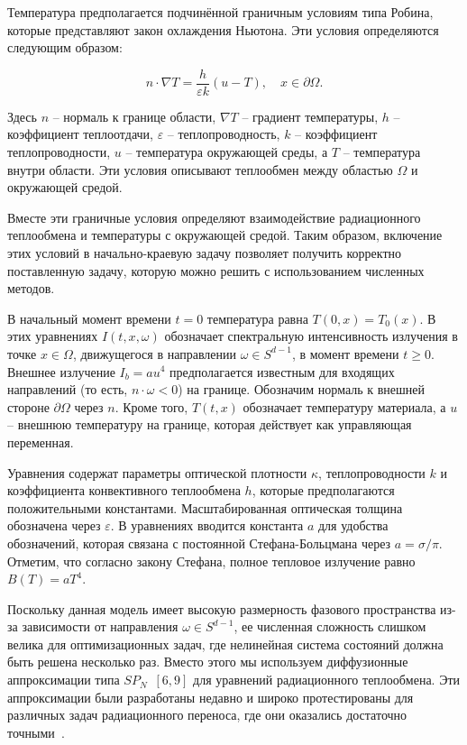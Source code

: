 Температура предполагается подчинённой граничным условиям типа Робина,
которые представляют закон охлаждения Ньютона.
Эти условия определяются следующим образом:

\[
    n \cdot \nabla T = \frac{h}{\varepsilon k}(u - T),
    \quad x \in \partial \Omega.
\]

Здесь $n$ -- нормаль к границе области, $\nabla T$ -- градиент температуры,
$h$ -- коэффициент теплоотдачи, $\varepsilon$ -- теплопроводность,
$k$ -- коэффициент теплопроводности, $u$ -- температура окружающей среды,
а $T$ -- температура внутри области.
Эти условия описывают теплообмен между областью $\Omega$ и окружающей средой.

Вместе эти граничные условия определяют взаимодействие радиационного
теплообмена и температуры с окружающей средой.
Таким образом, включение этих условий в начально-краевую задачу
позволяет получить корректно поставленную задачу, которую можно
решить с использованием численных методов.

В начальный момент времени $t = 0$ температура равна $T(0, x) = T_{0}(x)$.
В этих уравнениях $I(t, x, \omega)$ обозначает спектральную интенсивность
излучения в точке $x \in \Omega$, движущегося в направлении $\omega \in S^{d-1}$,
в момент времени $t \geq 0$.
Внешнее излучение $I_{b} = a u^{4}$ предполагается известным для входящих
направлений (то есть, $n \cdot \omega < 0$) на границе.
Обозначим нормаль к внешней стороне $\partial \Omega$ через $n$.
Кроме того, $T(t, x)$ обозначает температуру материала, а $u$ -- внешнюю
температуру на границе, которая действует как управляющая переменная.

Уравнения содержат параметры оптической плотности $\kappa$,
теплопроводности $k$ и коэффициента конвективного теплообмена $h$,
которые предполагаются положительными константами.
Масштабированная оптическая толщина обозначена через $\varepsilon$.
В уравнениях вводится константа $a$ для удобства обозначений, которая
связана с постоянной Стефана-Больцмана через $a = \sigma / \pi$.
Отметим, что согласно закону Стефана,
полное тепловое излучение равно $B(T) = a T^{4}$.

Поскольку данная модель имеет высокую размерность фазового пространства
из-за зависимости от направления $\omega \in S^{d-1}$, ее численная сложность
слишком велика для оптимизационных задач,
где нелинейная система состояний должна быть решена несколько раз.
Вместо этого мы используем диффузионные аппроксимации типа $S P_{N}$~\cite{Larsen2002, }$[6,9]$
для уравнений радиационного теплообмена.
Эти аппроксимации были разработаны недавно и широко протестированы
для различных задач радиационного переноса,
где они оказались достаточно точными~\cite{seaid2004efficient}.

